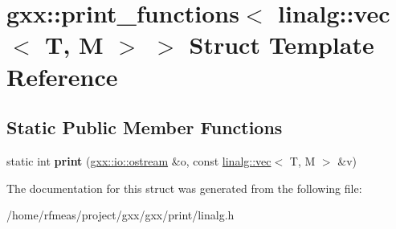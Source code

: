 \hypertarget{structgxx_1_1print__functions_3_01linalg_1_1vec_3_01T_00_01M_01_4_01_4}{}\section{gxx\+:\+:print\+\_\+functions$<$ linalg\+:\+:vec$<$ T, M $>$ $>$ Struct Template Reference}
\label{structgxx_1_1print__functions_3_01linalg_1_1vec_3_01T_00_01M_01_4_01_4}
\subsection*{Static Public Member Functions}
\begin{DoxyCompactItemize}
\item 
static int {\bfseries print} (\hyperlink{classgxx_1_1io_1_1ostream}{gxx\+::io\+::ostream} \&o, const \hyperlink{structlinalg_1_1vec}{linalg\+::vec}$<$ T, M $>$ \&v)\hypertarget{structgxx_1_1print__functions_3_01linalg_1_1vec_3_01T_00_01M_01_4_01_4_a7e28bdd9f9447c59d611ccba201de436}{}\label{structgxx_1_1print__functions_3_01linalg_1_1vec_3_01T_00_01M_01_4_01_4_a7e28bdd9f9447c59d611ccba201de436}

\end{DoxyCompactItemize}


The documentation for this struct was generated from the following file\+:\begin{DoxyCompactItemize}
\item 
/home/rfmeas/project/gxx/gxx/print/linalg.\+h\end{DoxyCompactItemize}
